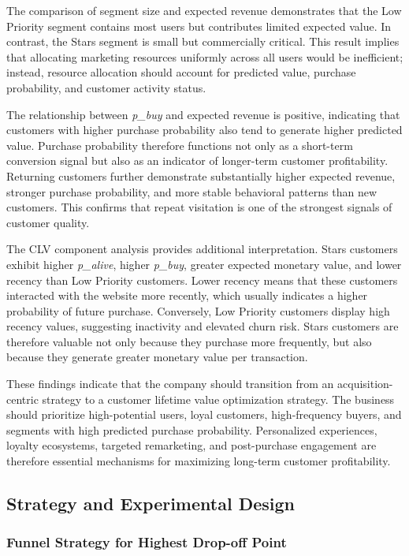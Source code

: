 \documentclass[conference]{IEEEtran}
\begin{document}
The comparison of segment size and expected revenue demonstrates that the Low Priority segment contains most users but contributes limited expected value. In contrast, the Stars segment is small but commercially critical. This result implies that allocating marketing resources uniformly across all users would be inefficient; instead, resource allocation should account for predicted value, purchase probability, and customer activity status.

The relationship between \textit{p\_buy} and expected revenue is positive, indicating that customers with higher purchase probability also tend to generate higher predicted value. Purchase probability therefore functions not only as a short-term conversion signal but also as an indicator of longer-term customer profitability. Returning customers further demonstrate substantially higher expected revenue, stronger purchase probability, and more stable behavioral patterns than new customers. This confirms that repeat visitation is one of the strongest signals of customer quality.

The CLV component analysis provides additional interpretation. Stars customers exhibit higher \textit{p\_alive}, higher \textit{p\_buy}, greater expected monetary value, and lower recency than Low Priority customers. Lower recency means that these customers interacted with the website more recently, which usually indicates a higher probability of future purchase. Conversely, Low Priority customers display high recency values, suggesting inactivity and elevated churn risk. Stars customers are therefore valuable not only because they purchase more frequently, but also because they generate greater monetary value per transaction.

These findings indicate that the company should transition from an acquisition-centric strategy to a customer lifetime value optimization strategy. The business should prioritize high-potential users, loyal customers, high-frequency buyers, and segments with high predicted purchase probability. Personalized experiences, loyalty ecosystems, targeted remarketing, and post-purchase engagement are therefore essential mechanisms for maximizing long-term customer profitability.


\subsection{Strategy and Experimental Design}
\subsubsection{Funnel Strategy for Highest Drop-off Point}
\end{document}
